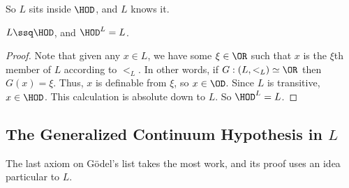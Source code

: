 So $L$ sits inside $\HOD$, and $L$ knows it.

\begin{boxtheorem}
    $L \ssq \HOD$, and $\HOD^L = L$.
\end{boxtheorem}
\begin{proof}
    Note that given any $x \in L$, we have some $\xi \in \OR$ such that $x$ is the $\xi$th member of $L$ according to $<_L$. In other words, if $G : (L, <_L) \simeq \OR$ then $G(x) = \xi$. Thus, $x$ is definable from $\xi$, so $x \in \OD$. Since $L$ is transitive, $x \in \HOD$. This calculation is absolute down to $L$. So $\HOD^L = L$.
\end{proof}

\subsection{The Generalized Continuum Hypothesis in $L$}

The last axiom on Gödel's list takes the most work, and its proof uses an idea particular to $L$.

